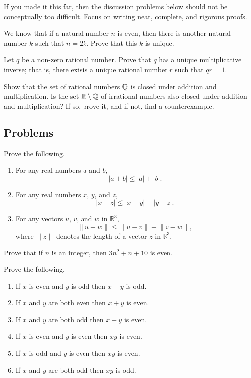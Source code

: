 \documentclass[../main.tex]{subfiles}
\begin{document}
If you made it this far, then the discussion problems below should not be conceptually too difficult. Focus on writing neat, complete, and rigorous proofs.
\begin{exercise}
    We know that if a natural number $n$ is even, then there is another natural number $k$ such that $n = 2k$. Prove that this $k$ is unique.
\end{exercise}
\begin{exercise}
    Let $q$ be a non-zero rational number. Prove that $q$ has a unique multiplicative inverse; that is, there exists a unique rational number $r$ such that $qr = 1$.
\end{exercise}
\begin{exercise}
    Show that the set of rational numbers $\mathbb Q$ is closed under addition and multiplication. Is the set $\mathbb R \setminus \mathbb Q$ of irrational numbers also closed under addition and multiplication? If so, prove it, and if not, find a counterexample.
\end{exercise}

\subsection{Problems}
\begin{homework}
    Prove the following.
    \begin{enumerate}[label=(\alph*)]
        \item For any real numbers $a$ and $b$,
        \[|a+b|\le|a|+|b|.\]
        \item For any real numbers $x$, $y$, and $z$,
        \[|x-z|\le|x-y|+|y-z|.\]
        \item For any vectors $u$, $v$, and $w$ in $\mathbb R^3$,
        \[\lVert u-w\rVert\le\lVert u-v\rVert+\lVert v-w\rVert,\]
        where $\lVert z\rVert$ denotes the length of a vector $z$ in $\mathbb R^3$.
    \end{enumerate}
\end{homework}

\begin{homework}
    Prove that if $n$ is an integer, then $3n^2 + n + 10$ is even.
\end{homework}

\begin{homework}
    Prove the following.
    \begin{enumerate}[label=(\alph*)]
        \item If $x$ is even and $y$ is odd then $x + y$ is odd.
        \item If $x$ and $y$ are both even then $x + y$ is even.
        \item If $x$ and $y$ are both odd then $x + y$ is even.
        \item If $x$ is even and $y$ is even then $xy$ is even.
        \item If $x$ is odd and $y$ is even then $xy$ is even.
        \item If $x$ and $y$ are both odd then $xy$ is odd.
    \end{enumerate}
\end{homework}
\end{document}
